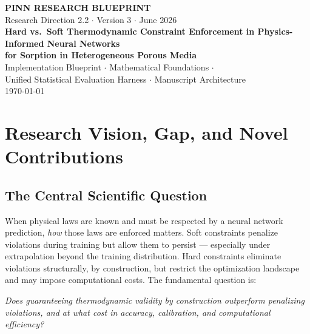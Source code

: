 \documentclass[12pt,a4paper]{article}
\begin{document}
\begin{titlepage}
\centering\vspace*{1.5cm}
{\LARGE\bfseries\color{blueprompt}PINN RESEARCH BLUEPRINT}\\[0.4cm]
{\large\color{gray}Research Direction 2.2 $\cdot$ Version 3 $\cdot$ June 2026}\\[1.2cm]
{\Large\bfseries
Hard vs.\ Soft Thermodynamic Constraint Enforcement 
in Physics-Informed Neural Networks\\[0.25cm]
for Sorption in Heterogeneous Porous Media}\\[1.8cm]
{\large\color{gray}
Implementation Blueprint $\cdot$ Mathematical Foundations $\cdot$\\
Unified Statistical Evaluation Harness $\cdot$ Manuscript Architecture}\\[1.2cm]

\vfill{\large\today}
\end{titlepage}

\tableofcontents\newpage

\section{Research Vision, Gap, and Novel Contributions}

\subsection{The Central Scientific Question}

When physical laws are known and must be respected by a neural network
prediction, \emph{how} those laws are enforced matters. Soft constraints
penalize violations during training but allow them to persist ---
especially under extrapolation beyond the training distribution.
Hard constraints eliminate violations structurally, by construction,
but restrict the optimization landscape and may impose computational
costs. The fundamental question is:

\begin{center}
\textit{Does guaranteeing thermodynamic validity by construction
outperform penalizing violations, and at what cost in accuracy,
calibration, and computational efficiency?}
\end{center}
\end{document}

